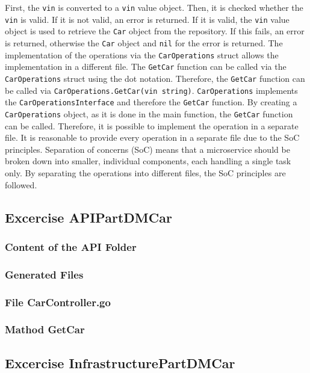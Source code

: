First, the \texttt{vin} is converted to a \texttt{vin} value object.
Then, it is checked whether the \texttt{vin} is valid.
If it is not valid, an error is returned.
If it is valid, the \texttt{vin} value object is used to retrieve the \texttt{Car} object from the repository.
If this fails, an error is returned, otherwise the \texttt{Car} object and \texttt{nil} for the error is returned.
The implementation of the operations via the \texttt{CarOperations} struct allows the implementation in a different file.
The \texttt{GetCar} function can be called via the \texttt{CarOperations} struct using the dot notation.
Therefore, the \texttt{GetCar} function can be called via \texttt{CarOperations.GetCar(vin string)}.
\texttt{CarOperations} implements the \texttt{CarOperationsInterface} and therefore the \texttt{GetCar} function.
By creating a \texttt{CarOperations} object, as it is done in the main function, the \texttt{GetCar} function can be called.
Therefore, it is possible to implement the operation in a separate file.
It is reasonable to provide every operation in a separate file due to the SoC principles.
Separation of concerns (SoC) means that a microservice should be broken down into smaller, individual components, each handling a single task only.
By separating the operations into different files, the SoC principles are followed.
\subsection{Excercise APIPartDMCar}
\subsubsection*{Content of the API Folder}
\subsubsection*{Generated Files}
\subsubsection*{File CarController.go}
\subsubsection*{Mathod GetCar}
\subsection{Excercise InfrastructurePartDMCar}
